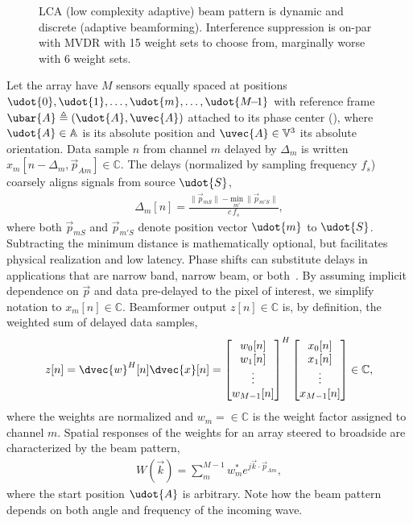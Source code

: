 {\begin{figure}[tp]
\caption{LCA (low complexity adaptive) beam pattern is dynamic and discrete (adaptive beamforming). Interference suppression is on-par with MVDR with 15 weight sets to choose from, marginally worse with 6 weight sets.}%
\label{2_fig_scenario_lca}
\end{figure}


Let the array have $M$ sensors equally spaced at positions $\udot{0},\udot{1},\dots, \udot{m}, \dots, \udot{M{\!-\!1}}$ with reference frame $\ubar{A} \triangleq (\udot{A},\uvec{A})$ attached to its phase center (), where $\udot{A}\in\mathbb{A}$ is its absolute position and $\uvec{A}\in\mathbb{V}^3$ its absolute orientation. Data sample $n$ from channel $m$ delayed by $\Delta_m$ is written $x_m[n-\Delta_{m}, \vec{p}_{Am}]\in\mathbb{C}$. The delays (normalized by sampling frequency $f_s$) coarsely aligns signals from source $\udot{S}$,
%
\begin{align}
\Delta_m[n] = \frac{\lVert \vec{p}_{mS}\rVert - \underset{m'}{\mathrm{min}}\ \lVert \vec{p}_{m'S}\rVert}{c\,f_s},\label{2_eq_delta}
\end{align}
%
where both $\vec{p}_{mS}$ and $\vec{p}_{m'S}$ denote position vector $\udot{m}$ to $\udot{S}$. Subtracting the minimum distance is mathematically optional, but facilitates physical realization and low latency. Phase shifts can substitute delays in applications that are narrow band, narrow beam, or both~\cite{Johnson1993}. By assuming implicit dependence on $\vec{p}$ and data pre-delayed to the pixel of interest, we simplify notation to $x_m[n]\in\mathbb{C}$. Beamformer output $z[n]\in\mathbb{C}$ is, by definition, the weighted sum of delayed data samples,
%
\begin{align}
z[n] = \dvec{w}^H[n]\dvec{x}[n] = \bmat{w_0[n]\\w_1[n]\\\vdots\\w_{M-1}[n]}^H \bmat{x_0[n]\\x_1[n]\\\vdots\\x_{M-1}[n]} \in\mathbb{C},\label{2_eq_z}
\end{align}
%
where the weights are normalized and $w_m=\in\mathbb{C}$ is the weight factor assigned to channel $m$. %
Spatial responses of the weights for an array steered to broadside are characterized by the beam pattern,
%
\begin{align}
W(\vec{k}) = \sum_m^{M-1} w_m^* e^{j\vec k \cdot \vec{p}_{Am}},\label{2_eq_beam pattern}
\end{align}
%
where the start position $\udot{A}$ is arbitrary. Note how the beam pattern depends on both angle and frequency of the incoming wave. 

}
